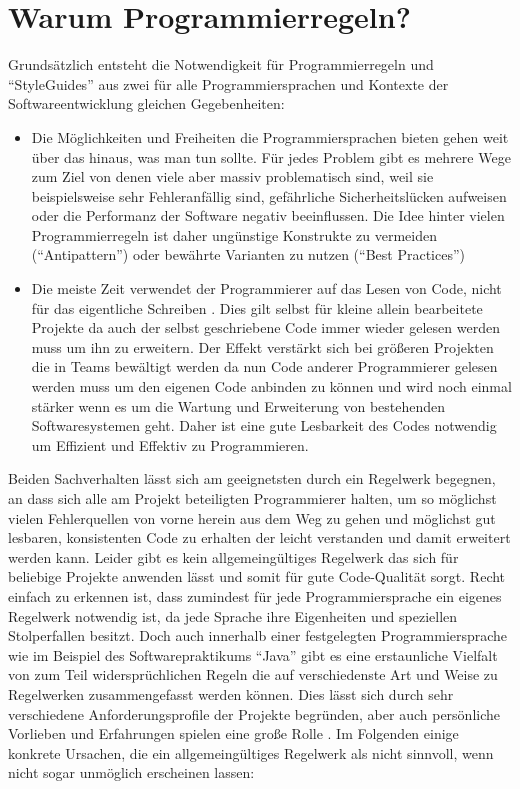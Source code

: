 \documentclass[da,ngerman]{stthesis}
\begin{document}
		\section{Warum Programmierregeln?}
			Grundsätzlich entsteht die Notwendigkeit für Programmierregeln und "`StyleGuides"' aus zwei für alle Programmiersprachen und Kontexte der Softwareentwicklung gleichen Gegebenheiten: 
			\begin{itemize}
				\item Die Möglichkeiten und Freiheiten die Programmiersprachen bieten gehen weit über das hinaus, was man tun sollte. Für jedes Problem gibt es mehrere Wege zum Ziel von denen viele aber massiv problematisch sind, weil sie beispielsweise sehr Fehleranfällig sind, gefährliche Sicherheitslücken aufweisen oder die Performanz der Software negativ beeinflussen. Die Idee hinter vielen Programmierregeln ist daher ungünstige Konstrukte zu vermeiden ("`Antipattern"') oder bewährte Varianten zu nutzen ("`Best Practices"')
				\item Die meiste Zeit verwendet der Programmierer auf das Lesen von Code, nicht für das eigentliche Schreiben \cite{CleanCode}. Dies gilt selbst für kleine allein bearbeitete Projekte da auch der selbst geschriebene Code immer wieder gelesen werden muss um ihn zu erweitern. Der Effekt verstärkt sich bei größeren Projekten die in Teams bewältigt werden da nun Code anderer Programmierer gelesen werden muss um den eigenen Code anbinden zu können und wird noch einmal stärker wenn es um die Wartung und Erweiterung von bestehenden Softwaresystemen geht. Daher ist eine gute Lesbarkeit des Codes notwendig um Effizient und Effektiv zu Programmieren. 
			\end{itemize}
			Beiden Sachverhalten lässt sich am geeignetsten durch ein Regelwerk begegnen, an dass sich alle am Projekt beteiligten Programmierer halten, um so möglichst vielen Fehlerquellen von vorne herein aus dem Weg zu gehen und möglichst gut lesbaren, konsistenten Code zu erhalten der leicht verstanden und damit erweitert werden kann.
			Leider gibt es kein allgemeingültiges Regelwerk das sich für beliebige Projekte anwenden lässt und somit für gute Code-Qualität sorgt. Recht einfach zu erkennen ist, dass zumindest für jede Programmiersprache ein eigenes Regelwerk notwendig ist, da jede Sprache ihre Eigenheiten und speziellen Stolperfallen besitzt. Doch auch innerhalb einer festgelegten Programmiersprache wie im Beispiel des Softwarepraktikums "`Java"' gibt es eine erstaunliche Vielfalt von zum Teil widersprüchlichen Regeln die auf verschiedenste Art und Weise zu Regelwerken zusammengefasst werden können. Dies lässt sich durch sehr verschiedene Anforderungsprofile der Projekte begründen, aber auch persönliche Vorlieben und Erfahrungen spielen eine große Rolle \cite{JavaQualityAssurance}. Im Folgenden einige konkrete Ursachen, die ein allgemeingültiges Regelwerk als nicht sinnvoll, wenn nicht sogar unmöglich erscheinen lassen:
\end{document}
